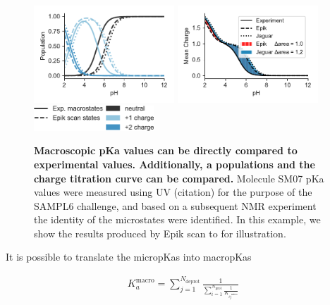 \documentclass[9pt,lineno,final]{elife}
\begin{document}
\begin{figure}[H]
\begin{gather*}
\end{gather*}
    \hfill
	\includegraphics[width=0.47\textwidth]{fig2_population_sm14.pdf}
	\includegraphics[width=0.47\textwidth]{fig2_charge_sm14.pdf} \\
 	\includegraphics[width=0.4\textwidth]{fig2_legend}
		\caption{{\bf Macroscopic pKa values can be directly compared to experimental values. Additionally, a populations and the charge titration curve can be compared.} Molecule SM07 pKa values were measured using UV (citation) for the purpose of the SAMPL6 challenge, and based on a subsequent NMR experiment the identity of the microstates were identified. In this example, we show the results produced by Epik scan to for illustration.
	\label{fig:scan-prediction}}
	
\end{figure}


It is possible to translate the micropKas into macropKas
\cite{Bochevarov2016multiconformation, Philipp2018macropka}

\begin{align}
 K_a^\text{macro} = \sum_{j=1}^{N_\text{deprot}} \frac{1}{\sum_{i=1}^{N_\text{prot}}\frac{1}{ K_{ij^\text{micro}}}} \label{eq:macropka}
 \end{align}

 
\end{document}

